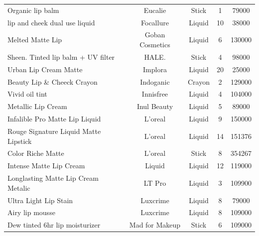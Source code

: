 \documentclass{article}
\begin{document}
\begin{longtable}{lcccc}
    Organic lip balm                        & Eucalie           & Stick                        & 1               & 79000          \\
    lip and cheek dual use liquid           & Focallure         & Liquid                       & 10              & 38000          \\
    Melted Matte Lip                        & Goban Cosmetics   & Liquid                       & 6               & 130000         \\
    Sheen. Tinted lip balm + UV filter      & HALE.             & Stick                        & 4               & 98000          \\
    Urban Lip Cream Matte                   & Implora           & Liquid                       & 20              & 25000          \\
    Beauty Lip \& Cheeck Crayon             & Indoganic         & Crayon                       & 2               & 129000         \\
    Vivid oil tint                          & Innisfree         & Liquid                       & 4               & 104000         \\
    Metallic Lip Cream                      & Inul Beauty       & Liquid                       & 5               & 89000          \\
    Infalible Pro Matte Lip Liquid          & L'oreal           & Liquid                       & 9               & 150000         \\
    Rouge Signature Liquid Matte Lipstick   & L'oreal           & Liquid                       & 14              & 151376         \\
    Color Riche Matte                       & L'oreal           & Stick                        & 8               & 354267         \\
    Intense Matte Lip Cream                 & Liquid            & Liquid                       & 12              & 119000         \\
    Longlasting Matte Lip Cream Metalic     & LT Pro            & Liquid                       & 3               & 109900         \\
    Ultra Light Lip Stain                   & Luxcrime          & Liquid                       & 8               & 79000          \\
    Airy lip mousse                         & Luxcrime          & Liquid                       & 8               & 109000         \\
    Dew tinted 6hr lip moisturizer          & Mad for Makeup    & Stick                        & 6               & 109000         \\

\end{longtable}
\end{document}
